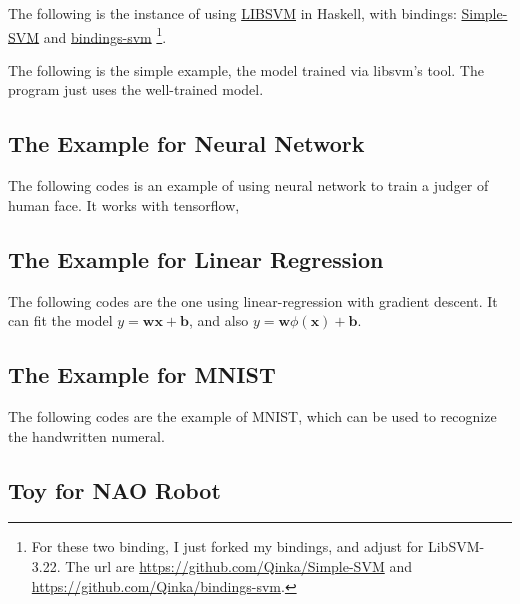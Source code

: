 \documentclass{article}
\begin{document}
\begin{appendix}
	The following is the instance of using \href{https://www.csie.ntu.edu.tw/~cjlin/libsvm/index.html}{LIBSVM} in Haskell, with bindings:
	\href{https://github.com/aleator/Simple-SVM}{Simple-SVM} and \href{https://github.com/delanoe/bindings-svm}{bindings-svm}%
	\footnote{For these two binding, I just forked my bindings, and adjust for LibSVM-3.22. The url are \url{https://github.com/Qinka/Simple-SVM} and \url{https://github.com/Qinka/bindings-svm}.}.
	
	The following is the simple example, the model trained via libsvm's tool. The program just uses the well-trained model.
	\setcounter{codeline}{1}
	
	\subsection{The Example for Neural Network}
	\label{code:nn}
	
	The following codes is an example of using neural network to train a judger of human face.
	It works with tensorflow,
	\setcounter{codeline}{1}
	
	\subsection{The Example for Linear Regression}
	\label{code:lr}
	
	The following codes are the one using linear-regression with gradient descent.
	It can fit the model $y = \mathbf{w}\mathbf{x} + \mathbf{b}$, and also $y = \mathbf{w}\phi(\mathbf{x})+\mathbf{b}$.
	\setcounter{codeline}{1}
	\setcounter{codeline}{1}
	\setcounter{codeline}{1}
	
	\subsection{The Example for MNIST}
	\label{code:mnist}
	
	The following codes are the example of MNIST, which can be used to recognize the handwritten numeral.
	\setcounter{codeline}{1}
	
	\subsection{Toy for NAO Robot}
	\label{code:nao}
	

\end{appendix}
\end{document}
